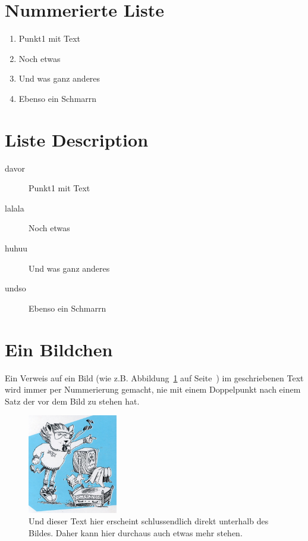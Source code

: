 \section{Nummerierte Liste}
\begin{enumerate}
\item Punkt1 mit Text
\item Noch etwas
\item Und was ganz anderes
\item Ebenso ein Schmarrn
\end{enumerate}


\section{Liste Description}
\begin{description}
\item[davor] Punkt1 mit Text
\item[lalala] Noch etwas
\item[huhuu] Und was ganz anderes
\item[undso] Ebenso ein Schmarrn
\end{description}


\section{Ein Bildchen}
Ein Verweis auf ein Bild (wie z.B. Abbildung~\ref{fig:texlogo} auf Seite~\pageref{fig:texlogo}) im geschriebenen Text wird immer per Nummerierung gemacht, nie mit einem Doppelpunkt nach einem Satz der vor dem Bild zu stehen hat.

\begin{figure}[ht]
        \centering
            \includegraphics[width=0.35\textwidth]{img/latex.jpg}    %
            \caption[\LaTeX~Logo]
                {Und dieser Text hier erscheint schlussendlich direkt unterhalb des Bildes. Daher kann hier durchaus auch etwas mehr stehen\citefigureown.}
            \label{fig:texlogo}
\end{figure}


